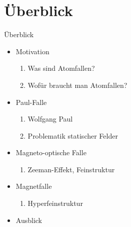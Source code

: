 \documentclass[12pt]{beamer}
\begin{document}
	\section{Überblick}
	\begin{frame}{Überblick}
		\begin{itemize}
			\item Motivation
			\begin{enumerate}
				\item Was sind Atomfallen?
				\item Wofür braucht man Atomfallen?
			\end{enumerate}
			
			\item Paul-Falle
			\begin{enumerate}
				\item Wolfgang Paul
				\item Problematik statischer Felder
			\end{enumerate}
			
			\item Magneto-optische Falle
			\begin{enumerate}
				\item Zeeman-Effekt, Feinstruktur
			\end{enumerate}
			
			\item Magnetfalle
			\begin{enumerate}
				\item Hyperfeinstruktur
			\end{enumerate}
			
			\item Ausblick
						
		\end{itemize}
	\end{frame}
	
\end{document}
